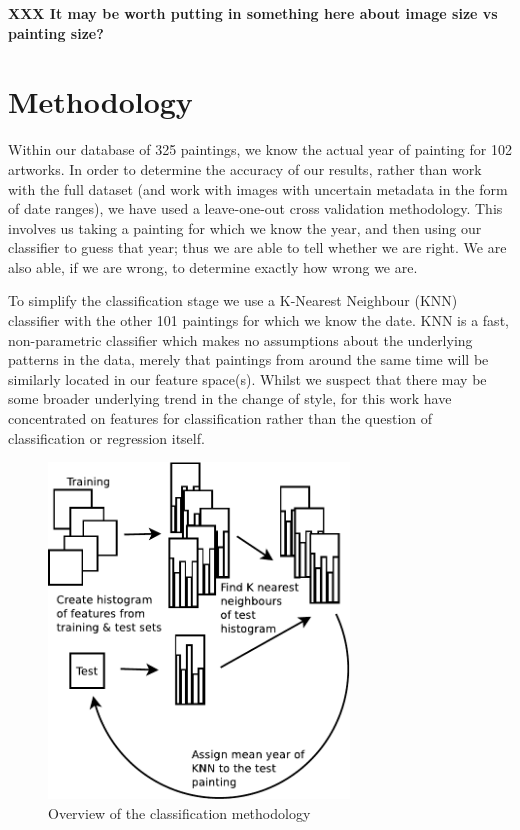 \documentclass[conference,a4paper]{IEEEtran}
\begin{document}
\textbf{XXX It may be worth putting in something here about image size vs painting size?}


\section{Methodology}

Within our database of 325 paintings, we know the actual year of painting for
102 artworks. In order to determine the accuracy of our results, rather than
work with the full dataset (and work with images with uncertain metadata in the
form of date ranges), we have used a leave-one-out cross validation
methodology. This involves us taking a painting for which we know the year, and
then using our classifier to guess that year; thus we are able to tell whether
we are right. We are also able, if we are wrong, to determine exactly how wrong
we are.  

To simplify the classification stage we use a K-Nearest Neighbour (KNN)
classifier with the other 101 paintings for which we know the date. KNN is a
fast, non-parametric classifier which makes no assumptions about the underlying
patterns in the data, merely that paintings from around the same time will be
similarly located in our feature space(s). Whilst we suspect that there may be
some broader underlying trend in the change of style, for this work have
concentrated on features for classification rather than the question of
classification or regression itself. 
 
\begin{figure}
\includegraphics[width=8cm]{img/kyffin_overview.pdf}
\caption{Overview of the classification methodology}
\label{LOOCV}
\end{figure}
\end{document}
